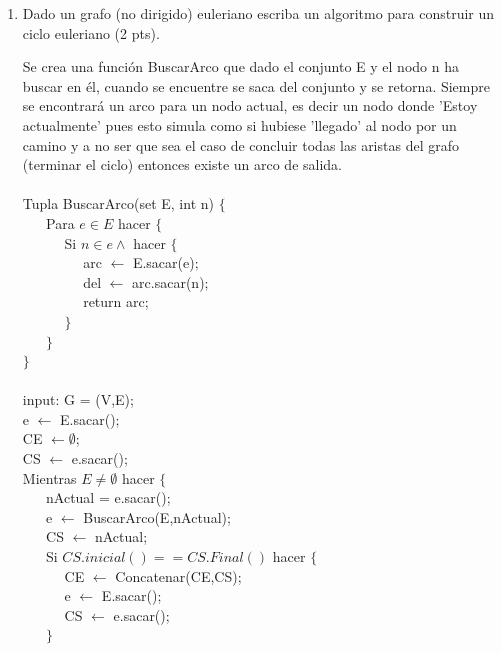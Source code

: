 \documentclass[a4paper,12pt]{article}
\begin{document}
\begin{enumerate}
\begin{flushleft}
\end{flushleft}

\item Dado un grafo (no dirigido) euleriano escriba un algoritmo para construir un ciclo euleriano (2 pts).

\begin{flushleft}

Se crea una función BuscarArco que dado el conjunto E y el nodo n ha buscar en él, cuando se encuentre se saca del conjunto y se retorna. Siempre se encontrará un arco para un nodo actual, es decir un nodo donde 'Estoy actualmente' pues esto simula como si hubiese 'llegado' al nodo por un camino y a no ser que sea el caso de concluir todas las aristas del grafo (terminar el ciclo) entonces existe un arco de salida. \\
$~~$ \\
Tupla BuscarArco(set E, int n) $\{$ \\
$~~~~~~$ Para $e \in E$ hacer $\{$ \\
$~~~~~~~~~~~~$ Si $n \in e \land $ hacer $\{$ \\
$~~~~~~~~~~~~~~~~~~$ arc $\leftarrow$ E.sacar(e);\\
$~~~~~~~~~~~~~~~~~~$ del $\leftarrow$ arc.sacar(n);\\
$~~~~~~~~~~~~~~~~~~$ return arc;\\
$~~~~~~~~~~~~$ $\}$ \\
$~~~~~~$ $\}$ \\
$\}$ \\
$~~$ \\
input: G = (V,E); \\
e $\leftarrow$ E.sacar(); \\
CE $\leftarrow \emptyset$; \\
CS $\leftarrow$ e.sacar(); \\
Mientras $E \neq \emptyset$ hacer $\{$ \\
$~~~~~~$ nActual = e.sacar();\\
$~~~~~~$ e $\leftarrow$ BuscarArco(E,nActual); \\
$~~~~~~$ CS $\leftarrow$ nActual; \\
$~~~~~~$ Si $CS.inicial() == CS.Final()$ hacer $\{$ \\
$~~~~~~~~~~~~$ CE $\leftarrow$ Concatenar(CE,CS); \\
$~~~~~~~~~~~~$ e $\leftarrow$ E.sacar(); \\
$~~~~~~~~~~~~$ CS $\leftarrow$ e.sacar(); \\
$~~~~~~$ $\}$ \\

\end{flushleft}
\end{enumerate}
\end{document}
